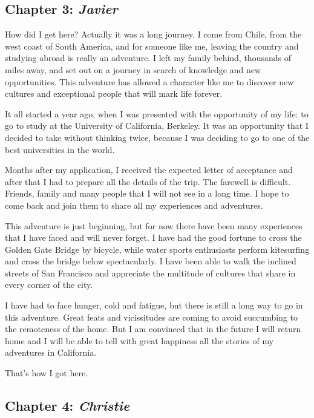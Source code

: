 \documentclass{article}
\begin{document}
\subsection*{Chapter 3: \textit{Javier}}

How did I get here? Actually it was a long journey. I come from Chile, from the west coast of South America, and for someone like me, leaving the country and studying abroad is really an adventure. I left my family behind, thousands of miles away, and set out on a journey in search of knowledge and new opportunities. This adventure has allowed a character like me to discover new cultures and exceptional people that will mark life forever.

It all started a year ago, when I was presented with the opportunity of my life: to go to study at the University of California, Berkeley. It was an opportunity that I decided to take without thinking twice, because I was deciding to go to one of the best universities in the world.

Months after my application, I received the expected letter of acceptance and after that I had to prepare all the details of the trip. The farewell is difficult. Friends, family and many people that I will not see in a long time. I hope to come back and join them to share all my experiences and adventures.

This adventure is just beginning, but for now there have been many experiences that I have faced and will never forget. I have had the good fortune to cross the Golden Gate Bridge by bicycle, while water sports enthusiasts perform kitesurfing and cross the bridge below spectacularly. I have been able to walk the inclined streets of San Francisco and appreciate the multitude of cultures that share in every corner of the city.

I have had to face hunger, cold and fatigue, but there is still a long way to go in this adventure. Great feats and vicissitudes are coming to avoid succumbing to the remoteness of the home. But I am convinced that in the future I will return home and I will be able to tell with great happiness all the stories of my adventures in California.

That's how I got here.


\subsection*{Chapter 4: \textit{Christie}}
\end{document}
